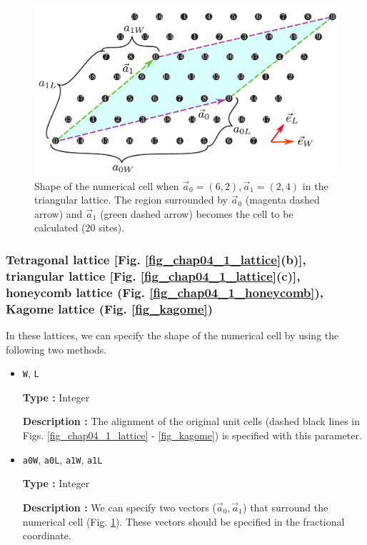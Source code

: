 \begin{figure}[!tbhp]
  \begin{center}
    \includegraphics[width=15cm]{../figs/chap04_1_unitlattice.pdf}
    \caption{Shape of the numerical cell 
      when ${\vec a}_0 = (6, 2), {\vec a}_1 = (2, 4)$
      in the triangular lattice.
      The region surrounded by 
      ${\vec a}_0$ (magenta dashed arrow) and ${\vec a}_1$ (green dashed arrow)
      becomes the cell to be calculated (20 sites).
    }
    \label{fig_chap04_1_unitlattice}
  \end{center}
\end{figure}

\subsubsection{Tetragonal lattice [Fig. \ref{fig_chap04_1_lattice}(b)], 
triangular lattice [Fig. \ref{fig_chap04_1_lattice}(c)],
honeycomb lattice (Fig. \ref{fig_chap04_1_honeycomb}),
Kagome lattice (Fig. \ref{fig_kagome})}

In these lattices,
we can specify the shape of the numerical cell by using the following two methods.

\begin{itemize}

\item \verb|W|, \verb|L|

{\bf Type :} Integer

{\bf Description :} The alignment of the original unit cells 
(dashed black lines in Figs. \ref{fig_chap04_1_lattice} - \ref{fig_kagome})
is specified with this parameter.

\item \verb|a0W|, \verb|a0L|, \verb|a1W|, \verb|a1L|

{\bf Type :} Integer

{\bf Description :} 
We can specify two vectors (${\vec a}_0, {\vec a}_1$)
that surround the numerical cell (Fig. \ref{fig_chap04_1_unitlattice}).
These vectors should be specified in the fractional coordinate.

\end{itemize}

